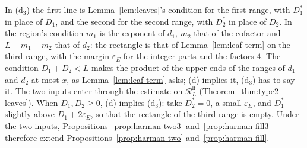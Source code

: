 \documentclass[11pt]{article}
\theoremstyle{definition}
\begin{document}
In (d$_3$) the first line is Lemma~\ref{lem:leaves}'s condition for the first range, with $D_1^*$ in place of $D_1$,
and the second for the second range, with $D_2^*$ in place of $D_2$. In the region's condition $m_1$ is the exponent of
$d_1$, $m_2$ that of the cofactor and $L - m_1 - m_2$ that of $d_2$: the rectangle is that of
Lemma~\ref{lem:leaf-term} on the third range, with the margin $\varepsilon_E$ for the integer parts and
the factors $4$. The condition $D_1 + D_2 < L$ makes the product of the upper ends of the ranges of $d_1$ and $d_2$ at
most $x$, as
Lemma~\ref{lem:leaf-term} asks; (d) implies it, (d$_3$) has to say it. The two inputs enter through the estimate on
$\mathcal R^{\mathrm{lf}}_L$ (Theorem~\ref{thm:type2-leaves}). When $D_1, D_2 \ge 0$, (d) implies (d$_3$): take $D_2^* =
0$, a small $\varepsilon_E$, and $D_1^*$ slightly above $D_1 + 2\varepsilon_E$, so that the rectangle of the third
range is empty. Under the two inputs, Propositions~\ref{prop:harman-two3} and~\ref{prop:harman-fill3} therefore extend
Propositions~\ref{prop:harman-two} and~\ref{prop:harman-fill}.
\end{document}
